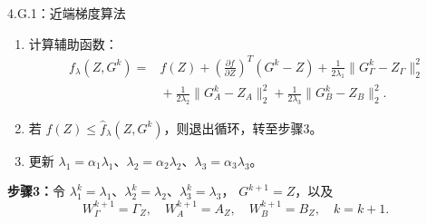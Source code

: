 \begin{bookalgorithm}{4.G.1：近端梯度算法}
\begin{enumerate}
\begin{equation}
\Gamma_z=(\gamma_{ij}^z)_{MT\times MT},\quad
A_z=(\alpha_{ij}^z)_{MT\times MT},\quad B_z=(\beta_{ij})_{KT\times MT}.\tag{4.G.26}
\end{equation}
\[
Z_\Gamma=\operatorname{vec}(\Gamma_z),\quad
Z_A=\operatorname{vec}(A_z),\quad Z_B=\operatorname{vec}(B_z).
\]
\item 计算辅助函数：
\[
\begin{aligned}
f_\lambda(Z,G^k)={}&f(Z)
+\left(\frac{\partial f}{\partial Z}\right)^T(G^k-Z)
+\frac1{2\lambda_1}\|G_\Gamma^k-Z_\Gamma\|_2^2\\
&{}+\frac1{2\lambda_2}\|G_A^k-Z_A\|_2^2
+\frac1{2\lambda_3}\|G_B^k-Z_B\|_2^2.
\end{aligned}
\]
\item 若 $f(Z)\le\widehat f_\lambda(Z,G^k)$，则退出循环，转至步骤3。
\item 更新 $\lambda_1=\alpha_1\lambda_1$、$\lambda_2=\alpha_2\lambda_2$、$\lambda_3=\alpha_3\lambda_3$。
\end{enumerate}
\textbf{步骤3：}令 $\lambda_1^k=\lambda_1$、$\lambda_2^k=\lambda_2$、$\lambda_3^k=\lambda_3$，
$G^{k+1}=Z$，以及
\begin{equation}
W_\Gamma^{k+1}=\Gamma_Z,\quad W_A^{k+1}=A_Z,\quad
W_B^{k+1}=B_Z,\quad k=k+1.\tag{4.G.27}
\end{equation}
\end{bookalgorithm}

